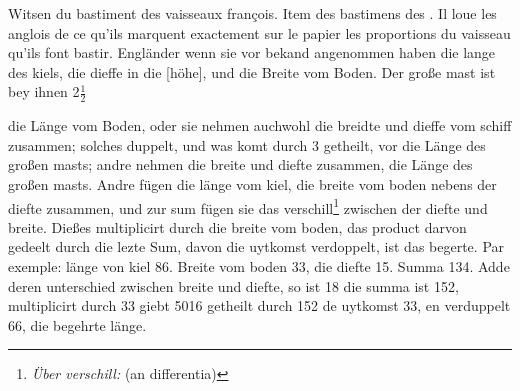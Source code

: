 \pend 
{} Witsen\protect{}  du bastiment des vaisseaux\protect{} fran\c{c}ois. Item des bastimens\protect{} des . Il loue les anglois de ce qu'ils marquent exactement sur le papier les proportions du vaisseau\protect{} qu'ils font bastir.  Engl\"{a}nder wenn sie vor bekand angenommen haben die lange des kiels\protect{}, die dieffe in die [h\"{o}he], und die Breite vom Boden. Der große mast\protect{} ist bey ihnen 2$\displaystyle\frac{1}{2}$\rule[-4mm]{0mm}{10mm} die L\"{a}nge vom Boden, oder sie nehmen auchwohl die breidte und dieffe vom schiff\protect{} zusammen; solches duppelt, und was komt durch 3 getheilt, vor die L\"{a}nge des großen masts\protect{}; andre nehmen die breite und diefte zusammen,   die L\"{a}nge des großen masts\protect{}. Andre f\"{u}gen die l\"{a}nge vom kiel\protect{}, die breite vom boden nebens der diefte zusammen, und zur sum f\"{u}gen sie das verschill\footnote{\textit{\"{U}ber verschill:} (an differentia)} zwischen der diefte und breite. Dießes multiplicirt durch die breite vom boden, das product darvon gedeelt durch die lezte Sum, davon die uytkomst verdoppelt, ist das begerte. Par exemple: l\"{a}nge von kiel\protect{} 86. Breite vom boden 33, die diefte 15. Summa 134. Adde deren unterschied zwischen breite und diefte, so ist 18 die summa ist 152, multiplicirt durch 33 giebt 5016 getheilt durch 152  de uytkomst 33, en verduppelt 66, die begehrte l\"{a}nge. 
